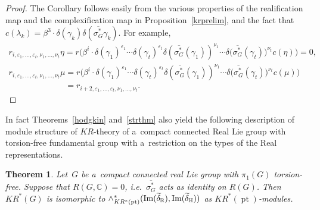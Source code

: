 \documentclass[11pt]{article}
\numberwithin{equation}{section}
\newtheorem{Theorem}{Theorem}[section]
\DeclareMathOperator{\pt}{pt}
\begin{document}
\begin{proof}
The Corollary follows easily from the various properties of the realif\/ication map and the complexif\/ication map in
Proposition~\ref{krprelim}, and the fact that $c(\lambda_k)=\beta^3\cdot\delta(\gamma_k)\delta(\overline{\sigma_G^*}
\gamma_k)$.
For example,
\begin{gather*}
r_{i, \varepsilon_1, \dots, \varepsilon_t, \nu_1, \dots,
\nu_t}\eta=r\big(\beta^i\cdot\delta(\gamma_1)^{\varepsilon_1}\cdots\delta(\gamma_t)^{\varepsilon_t}\delta(\overline{\sigma_G^*}
(\gamma_1))^{\nu_1}\cdots\delta\big(\overline{\sigma_G^*}(\gamma_t)\big)^{\nu_t}c(\eta)\big)
=0,
\\
r_{i, \varepsilon_1, \dots, \varepsilon_t, \nu_1, \dots,\nu_t}\mu
=r\big(\beta^i\cdot\delta(\gamma_1)^{\varepsilon_1}\cdots\delta(\gamma_t)^{\varepsilon_t}\delta(\overline{\sigma_G^*}
(\gamma_1))^{\nu_1}\cdots\delta\big(\overline{\sigma_G^*}(\gamma_t)\big)^{\nu_t}c(\mu)\big)
\\
\phantom{r_{i, \varepsilon_1, \dots, \varepsilon_t, \nu_1, \dots,\nu_t}\mu}
=r_{i+2, \varepsilon_1, \dots, \varepsilon_t, \nu_1, \dots, \nu_t}.\tag*{\qed}
\end{gather*}
\renewcommand{\qed}{}
\end{proof}

In fact Theorems~\ref{hodgkin} and~\ref{strthm} also yield the following description of module structure of
$KR$-theory of a~compact connected Real Lie group with torsion-free fundamental group with a~restriction on the types of
the Real representations.
\begin{Theorem}
\label{spkrtheorymodofg}
Let~$G$ be a~compact connected real Lie group with $\pi_1(G)$ torsion-free.
Suppose that $R(G, \mathbb{C})=0$, i.e.\
$\overline{\sigma_G^*}$ acts as identity on $R(G)$.
Then $KR^*(G)$ is isomorphic to $\wedge_{KR^*(\pt)}^*(\text{\rm Im}(\widetilde{\delta}_\mathbb{R}),
\text{\rm Im}(\widetilde{\delta}_\mathbb{H}))$ as $KR^*(\pt)$-modules.
\end{Theorem}
\end{document}
